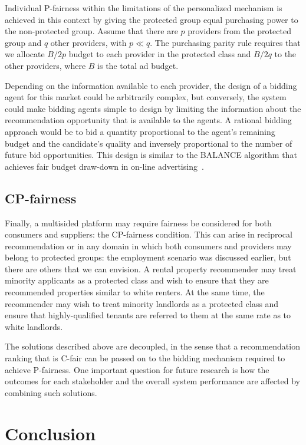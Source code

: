 Individual P-fairness within the limitations of the personalized mechanism is achieved in this context by giving the protected group equal purchasing power to the non-protected group. Assume that there are $p$ providers from the protected group and $q$ other providers, with $p \ll q$. The purchasing parity rule requires that we allocate $B / 2p$ budget to each provider in the protected class and $B / 2q$ to the other providers, where $B$ is the total ad budget. 

Depending on the information available to each pro\-vi\-der, the design of a bidding agent for this market could be arbitrarily complex, but conversely, the system could make bidding agents simple to design by limiting the information about the recommendation opportunity that is available to the agents. A rational bidding approach would be to bid a quantity proportional to the agent's remaining budget and the candidate's quality and inversely proportional to the number of future bid opportunities. This design is similar to the BALANCE algorithm that achieves fair budget draw-down in on-line advertising~\cite{optimalmatchingKalyanasundaram}. 

\subsection{CP-fairness}

Finally, a multisided platform may require fairness be considered for both consumers and suppliers: the CP-fairness condition. This can arise in reciprocal recommendation or in any domain in which both consumers and providers may belong to protected groups: the employment scenario was discussed earlier, but there are others that we can envision. A rental property recommender may treat minority applicants as a protected class and wish to ensure that they are recommended properties similar to white renters. At the same time, the recommender may wish to treat minority landlords as a protected class and ensure that highly-qualified tenants are referred to them at the same rate as to white landlords.

The solutions described above are decoupled, in the sense that a recommendation ranking that is C-fair can be passed on to the bidding mechanism required to achieve P-fairness. One important question for future research is how the outcomes for each stakeholder and the overall system performance are affected by combining such solutions.

\section{Conclusion}

